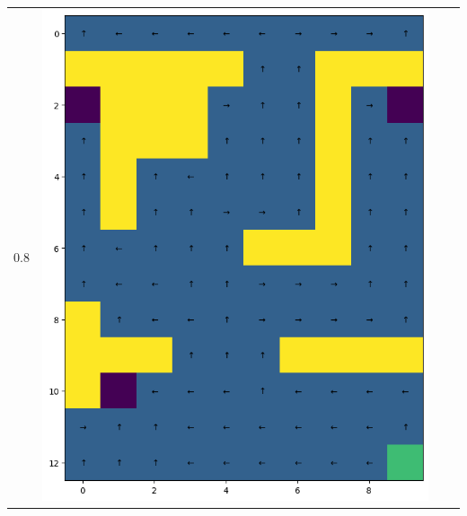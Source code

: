 \begin{landscape}
\begin{center}
\begin{tabular}{c || c  c  c}
        \\
        0.8 &
            \includegraphics[width=0.35\textheight]{assets/dp/analysis/prob_0.1_gamma_0.8_policy.png}
        & 

\end{tabular}
\end{center}
\end{landscape}
